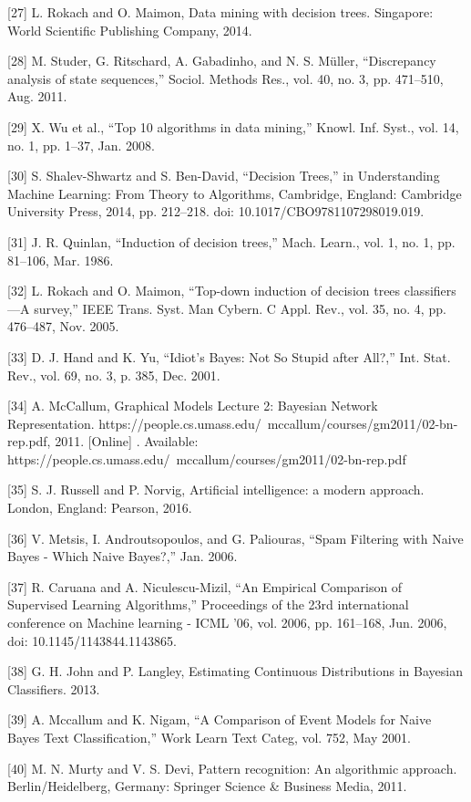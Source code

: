 \documentclass[sn-mathphys-num]{sn-jnl}%
\begin{document}
[27] L. Rokach and O. Maimon, Data mining with decision trees. Singapore: World Scientific Publishing Company, 2014.

[28] M. Studer, G. Ritschard, A. Gabadinho, and N. S. Müller, “Discrepancy analysis of state sequences,” Sociol. Methods Res., vol. 40, no. 3, pp. 471–510, Aug. 2011.

[29] X. Wu et al., “Top 10 algorithms in data mining,” Knowl. Inf. Syst., vol. 14, no. 1, pp. 1–37, Jan. 2008.

[30] S. Shalev-Shwartz and S. Ben-David, “Decision Trees,” in Understanding Machine Learning: From Theory to Algorithms, Cambridge, England: Cambridge University Press, 2014, pp. 212–218. doi: 10.1017/CBO9781107298019.019.

[31] J. R. Quinlan, “Induction of decision trees,” Mach. Learn., vol. 1, no. 1, pp. 81–106, Mar. 1986.

[32] L. Rokach and O. Maimon, “Top-down induction of decision trees classifiers—A survey,” IEEE Trans. Syst. Man Cybern. C Appl. Rev., vol. 35, no. 4, pp. 476–487, Nov. 2005.

[33] D. J. Hand and K. Yu, “Idiot’s Bayes: Not So Stupid after All?,” Int. Stat. Rev., vol. 69, no. 3, p. 385, Dec. 2001.

[34] A. McCallum, Graphical Models Lecture 2: Bayesian Network Representation. https://people.cs.umass.edu/ mccallum/courses/gm2011/02-bn-rep.pdf, 2011. [Online] . Available: https://people.cs.umass.edu/ mccallum/courses/gm2011/02-bn-rep.pdf

[35] S. J. Russell and P. Norvig, Artificial intelligence: a modern approach. London, England: Pearson, 2016.

[36] V. Metsis, I. Androutsopoulos, and G. Paliouras, “Spam Filtering with Naive Bayes - Which Naive Bayes?,” Jan. 2006.

[37] R. Caruana and A. Niculescu-Mizil, “An Empirical Comparison of Supervised Learning Algorithms,” Proceedings of the 23rd international conference on Machine learning - ICML ’06, vol. 2006, pp. 161–168, Jun. 2006, doi: 10.1145/1143844.1143865.

[38] G. H. John and P. Langley, Estimating Continuous Distributions in Bayesian Classifiers. 2013.

[39] A. Mccallum and K. Nigam, “A Comparison of Event Models for Naive Bayes Text Classification,” Work Learn Text Categ, vol. 752, May 2001.

[40] M. N. Murty and V. S. Devi, Pattern recognition: An algorithmic approach. Berlin/Heidelberg, Germany: Springer Science & Business Media, 2011.
\end{document}
